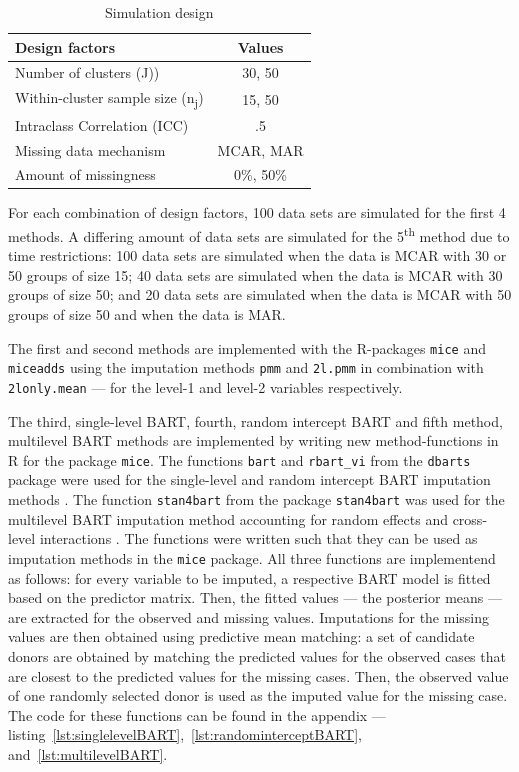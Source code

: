 \documentclass[10pt, a4paper, titlepage]{article}
\begin{document}
\begin{table}
\centering
\caption{Simulation design}
\label{tab:simulationparameters}
\begin{tabular}{l|c}
        \textbf{Design factors}                             & \textbf{Values} \\ \hline
        Number of clusters (J))                             & 30, 50 \\
        Within-cluster sample size (n\textsubscript{j})     & 15, 50 \\
        Intraclass Correlation (ICC)                        & .5 \\
        Missing data mechanism                              & MCAR, MAR \\
        Amount of missingness                               & 0\%, 50\%
\end{tabular}
\end{table} 
For each combination of design factors, 100 data sets are simulated for the first 4 methods. A differing amount of data sets are simulated for the 5\textsuperscript{th} method due to time restrictions: 100 data sets are simulated when the data is MCAR with 30 or 50 groups of size 15; 40 data sets are simulated when the data is MCAR with 30 groups of size 50; and 20 data sets are simulated when the data is MCAR with 50 groups of size 50 and when the data is MAR.

The first and second methods are implemented with the R-packages \texttt{mice} and \texttt{miceadds} \citep{robitzsch2024} using the imputation methods \texttt{pmm} and \texttt{2l.pmm} in combination with \texttt{2lonly.mean} --- for the level-1 and level-2 variables respectively.

The third, single-level BART, fourth, random intercept BART and fifth method, multilevel BART methods are implemented by writing new method-functions in R \citep{rcoreteam2023} for the package \texttt{mice}. The functions \texttt{bart} and \texttt{rbart\_vi} from the \texttt{dbarts} package were used for the single-level and random intercept BART imputation methods \citep{dorie2024}. The function \texttt{stan4bart} from the package \texttt{stan4bart} was used for the multilevel BART imputation method accounting for random effects and cross-level interactions \citep{dorie2023a}. The functions were written such that they can be used as imputation methods in the \texttt{mice} package. All three functions are implementend as follows: for every variable to be imputed, a respective BART model is fitted based on the predictor matrix. Then, the fitted values --- the posterior means --- are extracted for the observed and missing values. Imputations for the missing values are then obtained using predictive mean matching: a set of candidate donors are obtained by matching the predicted values for the observed cases that are closest to the predicted values for the missing cases. Then, the observed value of one randomly selected donor is used as the imputed value for the missing case. The code for these functions can be found in the appendix --- listing~\ref{lst:singlelevelBART},~\ref{lst:randominterceptBART}, and~\ref{lst:multilevelBART}.
\end{document}
